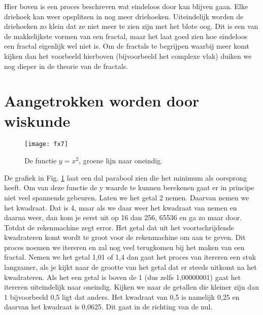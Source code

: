 \documentclass[11pt,fleqn]{book} %
\begin{document}
Hier boven is een proces beschreven wat eindeloos door kan blijven gaan. Elke driehoek kan weer opsplitsen in nog meer driehoeken. Uiteindelijk worden de driehoeken zo klein dat ze niet meer te zien zijn met het blote oog. Dit is een van de makkelijkste vormen van een fractal, maar het laat goed zien hoe eindeloos een fractal eigenlijk wel niet is.
Om de fractals te begrijpen waarbij meer komt kijken dan het voorbeeld hierboven (bijvoorbeeld het complexe vlak) duiken we nog dieper in de theorie van de fractals.

\section{Aangetrokken worden door wiskunde}
\begin{figure}[h]
	\centering\texttt{[image: fx7]}
	\caption{De functie $y=x^2$, groene lijn naar oneindig.}
	\label{fig:fx7}
\end{figure}
De grafiek in Fig. \ref{fig:fx7} laat een dal parabool zien die het minimum als oorsprong heeft. Om van deze functie de y waarde te kunnen berekenen gaat er in principe niet veel spannends gebeuren. Laten we het getal 2 nemen. Daarvan nemen we het kwadraat. Dat is 4, maar als we daar weer het kwadraat van nemen en daarna weer, dan kom je eerst uit op 16 dan 256, 65536 en ga zo maar door. Totdat de rekenmachine zegt error. Het getal dat uit het voortschrijdende kwadrateren komt wordt te groot voor de rekenmachine om aan te geven. Dit proces noemen we itereren en zal nog veel terugkomen bij het maken van een fractal. Nemen we het getal 1,01 of 1,4 dan gaat het proces van itereren een stuk langzamer, als je kijkt naar de grootte van het getal dat er steeds uitkomt na het kwadrateren. Als het een getal is boven de 1 (dus zelfs 1,00000001) gaat het itereren uiteindelijk naar oneindig. Kijken we naar de getallen die kleiner zijn dan 1 bijvoorbeeld 0,5 ligt dat anders. Het kwadraat van 0,5 is namelijk 0,25 en daarvan het kwadraat is 0,0625. Dit gaat in de richting van de nul.
\end{document}
